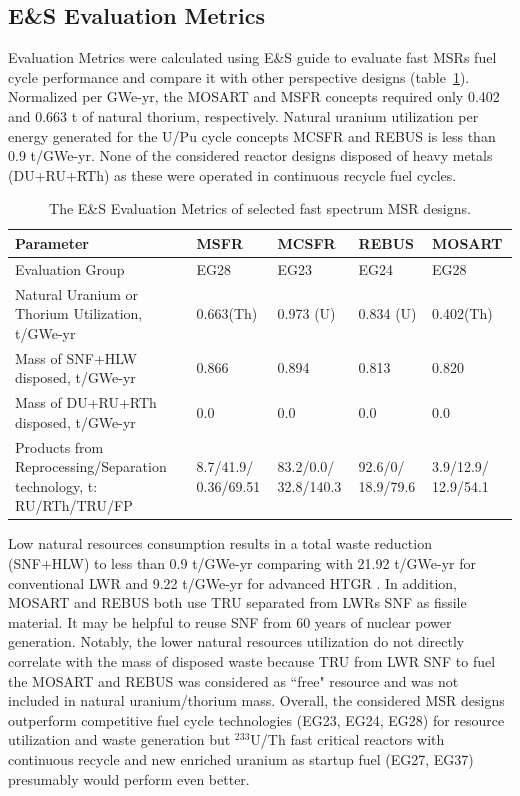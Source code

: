 \documentclass[letterpaper]{mandc2019}
\begin{document}
\subsection{E\&S Evaluation Metrics}
\label{sec:metrics}
Evaluation Metrics were calculated using E\&S guide \cite{wigeland_nuclear_2014-4} to evaluate fast \glspl{MSR} fuel cycle performance and compare it with other perspective designs (table~\ref{table:metrics}). Normalized per GWe-yr, the \gls{MOSART} and \gls{MSFR} concepts required only 0.402 and 0.663 t of natural thorium, respectively. Natural uranium utilization per energy generated for the U/Pu cycle concepts \gls{MCSFR} and REBUS is less than 0.9 t/GWe-yr. None of the considered reactor designs disposed of heavy metals (\gls{DU}+\gls{RU}+\gls{RTh}) as these were operated in continuous recycle fuel cycles.
\begin{table}[hb!]
  \vspace{-0.5in}
  \centering
  \caption{The E\&S Evaluation Metrics of selected fast spectrum \gls{MSR} designs.}
  \label{table:metrics}
  \begin{tabular}{p{} p{} p{} p{} p{}} \toprule
   Parameter &  \gls{MSFR} & \gls{MCSFR} & REBUS & \gls{MOSART} \\ \midrule
   Evaluation Group	&  EG28 & EG23 & EG24 & EG28   \\
   Natural Uranium or Thorium Utilization, t/GWe-yr & 0.663(Th) & 0.973 (U) & 0.834 (U) & 0.402(Th) \\
   Mass of \gls{SNF}+\gls{HLW} disposed, t/GWe-yr & 0.866 & 0.894 & 0.813 &  0.820 \\
   Mass of DU+RU+RTh disposed, t/GWe-yr & 0.0 & 0.0 & 0.0 &  0.0 \\
   Products from Reprocessing/Separation technology, t: \gls{RU}/\gls{RTh}/\gls{TRU}/\gls{FP} &
   8.7/41.9/ 0.36/69.51 &  83.2/0.0/ 32.8/140.3 & 92.6/0/ 18.9/79.6 & 3.9/12.9/ 12.9/54.1  \\
 \bottomrule
  \end{tabular}
    \vspace{-0.4in}
\end{table}

Low natural resources consumption results in a total waste reduction (\gls{SNF}+\gls{HLW}) to less than 0.9 t/GWe-yr comparing with 21.92 t/GWe-yr for conventional \gls{LWR} and 9.22 t/GWe-yr for advanced \gls{HTGR} \cite{wigeland_nuclear_2014-4}. 
In addition, \gls{MOSART} and REBUS both use \gls{TRU} separated from \glspl{LWR} \gls{SNF} as fissile material. It may be helpful to reuse \gls{SNF} from 60 years of nuclear power generation. Notably, the lower natural resources utilization do not directly correlate with the mass of disposed waste because TRU from \gls{LWR} \gls{SNF} to fuel the \gls{MOSART} and REBUS was considered as ``free" resource and was not included in natural uranium/thorium mass. Overall, the considered \gls{MSR} designs outperform competitive fuel cycle technologies (EG23, EG24, EG28) for resource utilization and waste generation but $^{233}$U/Th fast critical reactors with continuous recycle and new enriched uranium as startup fuel (EG27, EG37) presumably would perform even better.
\end{document}
